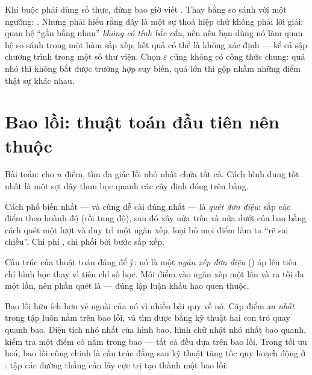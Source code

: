 \documentclass[../../algorithm.tex]{subfiles}
\begin{document}
\begin{cambay}
Khi buộc phải dùng số thực, đừng bao giờ viết . Thay bằng so sánh với một ngưỡng: . Nhưng phải hiểu rằng đây là một sự thoả hiệp chứ không phải lời giải: quan hệ ``gần bằng nhau'' \emph{không có tính bắc cầu}, nên nếu bạn dùng nó làm quan hệ so sánh trong một hàm sắp xếp, kết quả có thể là không xác định --- kể cả sập chương trình trong một số thư viện. Chọn \(\varepsilon\) cũng không có công thức chung: quá nhỏ thì không bắt được trường hợp suy biến, quá lớn thì gộp nhầm những điểm thật sự khác nhau.
\end{cambay}

\section{Bao lồi: thuật toán đầu tiên nên thuộc}

Bài toán: cho \(n\) điểm, tìm đa giác lồi nhỏ nhất chứa tất cả. Cách hình dung tốt nhất là một sợi dây thun bọc quanh các cây đinh đóng trên bảng.

Cách phổ biến nhất --- và cũng dễ cài đúng nhất --- là \emph{quét đơn điệu}: sắp các điểm theo hoành độ (rồi tung độ), sau đó xây nửa trên và nửa dưới của bao bằng cách quét một lượt và duy trì một ngăn xếp, loại bỏ mọi điểm làm ta ``rẽ sai chiều''. Chi phí , chi phối bởi bước sắp xếp.

Cấu trúc của thuật toán đáng để ý: nó là một \emph{ngăn xếp đơn điệu} () áp lên tiêu chí hình học thay vì tiêu chí số học. Mỗi điểm vào ngăn xếp một lần và ra tối đa một lần, nên phần quét là  --- đúng lập luận khấu hao quen thuộc.

Bao lồi hữu ích hơn vẻ ngoài của nó vì nhiều bài quy về nó. Cặp điểm \emph{xa nhất} trong tập luôn nằm trên bao lồi, và tìm được bằng kỹ thuật hai con trỏ quay quanh bao. Diện tích nhỏ nhất của hình bao, hình chữ nhật nhỏ nhất bao quanh, kiểm tra một điểm có nằm trong bao --- tất cả đều dựa trên bao lồi. Trong tối ưu hoá, bao lồi cũng chính là cấu trúc đằng sau kỹ thuật tăng tốc quy hoạch động ở : tập các đường thẳng cần lấy cực trị tạo thành một bao lồi.
\end{document}
